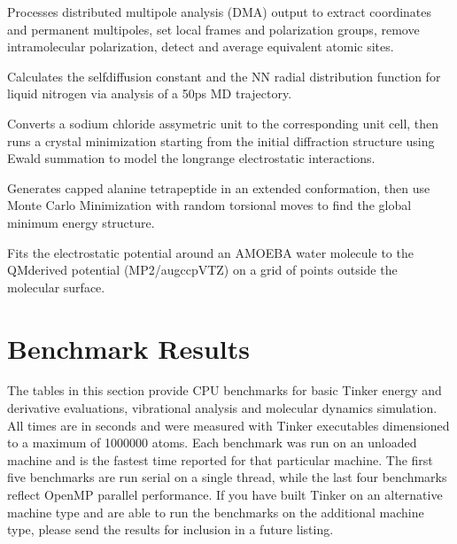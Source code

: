 \documentclass[letterpaper,11pt,english]{sphinxmanual}
\begin{document}

Processes distributed multipole analysis (DMA) output to extract coordinates and permanent multipoles, set local frames and polarization groups, remove intramolecular polarization, detect and average equivalent atomic sites.


Calculates the self\sphinxhyphen{}diffusion constant and the N\sphinxhyphen{}N radial distribution function for liquid nitrogen via analysis of a 50ps MD trajectory.


Converts a sodium chloride assymetric unit to the corresponding unit cell, then runs a crystal minimization starting from the initial diffraction structure using Ewald summation to model the long\sphinxhyphen{}range electrostatic interactions.


Generates capped alanine tetrapeptide in an extended conformation, then use Monte Carlo Minimization with random torsional moves to find the global minimum energy structure.


Fits the electrostatic potential around an AMOEBA water molecule to the QM\sphinxhyphen{}derived potential (MP2/aug\sphinxhyphen{}cc\sphinxhyphen{}pVTZ) on a grid of points outside the molecular surface.


\chapter{Benchmark Results}
\label{\detokenize{text/benchmarks:benchmark-results}}\label{\detokenize{text/benchmarks::doc}}
The tables in this section provide CPU benchmarks for basic Tinker energy and derivative evaluations, vibrational analysis and molecular dynamics simulation. All times are in seconds and were measured with Tinker executables dimensioned to a maximum of 1000000 atoms. Each benchmark was run on an unloaded machine and is the fastest time reported for that particular machine. The first five benchmarks are run serial on a single thread, while the last four benchmarks reflect OpenMP parallel performance. If you have built Tinker on an alternative machine type and are able to run the benchmarks on the additional machine type, please send the results for inclusion in a future listing.
\end{document}
